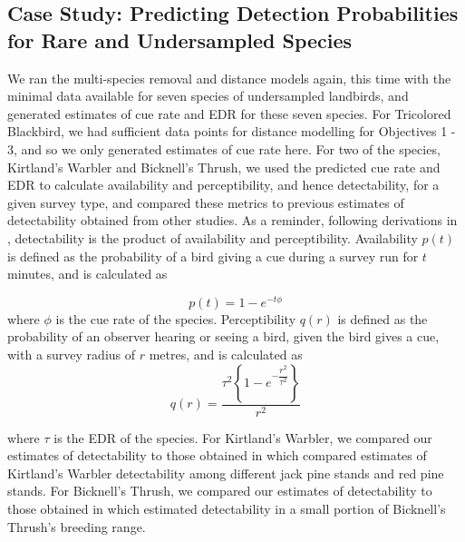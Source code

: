 \subsection{Case Study: Predicting Detection Probabilities for Rare and Undersampled Species}
\par We ran the multi-species removal and distance models again, this time with the minimal data available for seven species of undersampled landbirds, and generated estimates of cue rate and EDR for these seven species.
For Tricolored Blackbird, we had sufficient data points for distance modelling for Objectives 1 - 3, and so we only generated estimates of cue rate here.
For two of the species, Kirtland's Warbler and Bicknell's Thrush, we used the predicted cue rate and EDR to calculate availability and perceptibility, and hence detectability, for a given survey type, and compared these metrics to previous estimates of detectability obtained from other studies.
As a reminder, following derivations in \citet{solymos_calibrating_2013}, detectability is the product of availability and perceptibility.
Availability $p(t)$ is defined as the probability of a bird giving a cue during a survey run for $t$ minutes, and is calculated as

\begin{equation}
	p(t) = 1 - e^{-t\phi}
\end{equation}
where $\phi$ is the cue rate of the species.
Perceptibility $q(r)$ is defined as the probability of an observer hearing or seeing a bird, given the bird gives a cue, with a survey radius of $r$ metres, and is calculated as
\begin{equation}
	q(r) = \dfrac{\tau^2 \left\{1 - e^{-\dfrac{r^2}{\tau^2}}\right\}}{r^2}
\end{equation}

where $\tau$ is the EDR of the species.
For Kirtland's Warbler, we compared our estimates of detectability to those obtained in \citet{van_dyke_comparative_2022} which compared estimates of Kirtland's Warbler detectability among different jack pine stands and red pine stands.
For Bicknell's Thrush, we compared our estimates of detectability to those obtained in \citet{aubry_bicknells_2018} which estimated detectability in a small portion of Bicknell's Thrush's breeding range.

